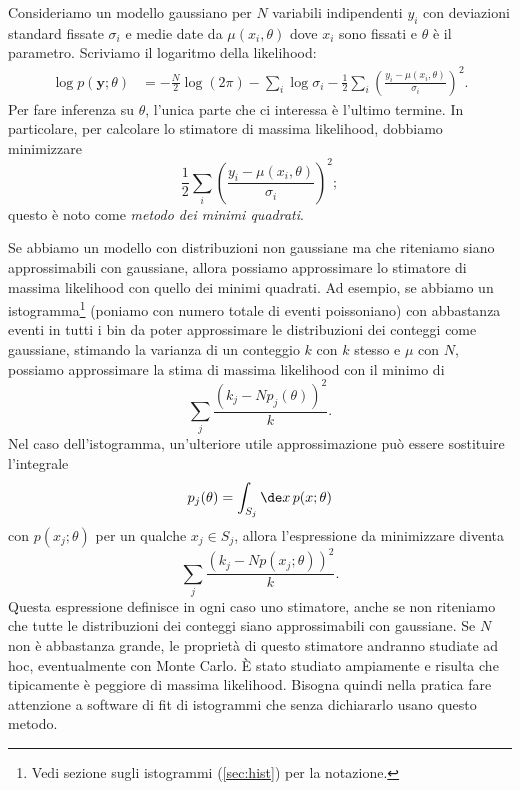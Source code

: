 
Consideriamo un modello gaussiano per $N$ variabili indipendenti $y_i$
con deviazioni standard fissate $\sigma_i$
e medie date da $\mu(x_i,\theta)$ dove $x_i$ sono fissati e $\theta$ è il parametro.
Scriviamo il logaritmo della likelihood:
\begin{align*}
	\log p(\mathbf y;\theta)
	&= -\frac N2\log(2\pi)
	- \sum_i\log\sigma_i
	- \frac12 \sum_i \left( \frac{y_i - \mu(x_i,\theta)}{\sigma_i} \right)^2.
\end{align*}
Per fare inferenza su $\theta$, l'unica parte che ci interessa è l'ultimo termine.
In particolare, per calcolare lo stimatore di massima likelihood, dobbiamo minimizzare
\begin{equation*}
	\frac12 \sum_i \left( \frac{y_i - \mu(x_i,\theta)}{\sigma_i} \right)^2;
\end{equation*}
questo è noto come \emph{metodo dei minimi quadrati}.

Se abbiamo un modello con distribuzioni non gaussiane ma che riteniamo siano approssimabili con gaussiane,
allora possiamo approssimare lo stimatore di massima likelihood con quello dei minimi quadrati.
Ad esempio, se abbiamo un istogramma\footnote{Vedi sezione sugli istogrammi (\ref{sec:hist}) per la notazione.}
(poniamo con numero totale di eventi poissoniano)
con abbastanza eventi in tutti i bin da poter approssimare le distribuzioni dei conteggi come gaussiane,
stimando la varianza di un conteggio $k$ con $k$ stesso e $\mu$ con $N$,
possiamo approssimare la stima di massima likelihood con il minimo di
\begin{equation*}
	\sum_j \frac{(k_j - Np_j(\theta))^2}{k}.
\end{equation*}
Nel caso dell'istogramma, un'ulteriore utile approssimazione può essere sostituire l'integrale
\begin{equation*}
	p_j(\theta) = \int_{S_j} \de x\, p(x;\theta)
\end{equation*}
con $p(x_j;\theta)$ per un qualche $x_j\in S_j$, allora l'espressione da minimizzare diventa
\begin{equation*}
	\sum_j \frac{(k_j - Np(x_j;\theta))^2}{k}.
\end{equation*}
Questa espressione definisce in ogni caso uno stimatore,
anche se non riteniamo che tutte le distribuzioni dei conteggi siano approssimabili con gaussiane.
Se $N$ non è abbastanza grande, le proprietà di questo stimatore andranno studiate ad hoc,
eventualmente con Monte Carlo.
È stato studiato ampiamente e risulta che tipicamente è peggiore di massima likelihood.
Bisogna quindi nella pratica fare attenzione a software di fit di istogrammi che senza dichiararlo usano questo metodo.


